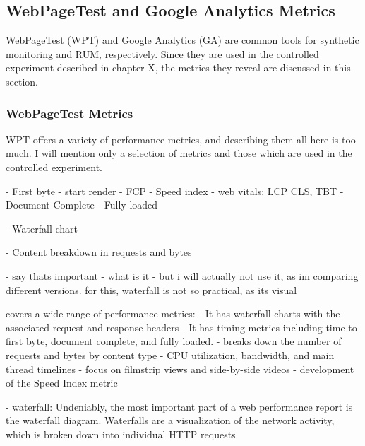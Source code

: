 
\subsection{WebPageTest and Google Analytics Metrics}
\label{subsection:wpt_ga_metrics}

WebPageTest (WPT) and Google Analytics (GA) are common tools for synthetic monitoring and RUM, respectively.
Since they are used in the controlled experiment described in chapter X, the metrics they reveal are discussed in this section.



\subsubsection{WebPageTest Metrics}

WPT offers a variety of performance metrics, and describing them all here is too much.
I will mention only a selection of metrics and those which are used in the controlled experiment.


- First byte
- start render
- FCP
- Speed index
- web vitals: LCP CLS, TBT
- Document Complete
- Fully loaded

- Waterfall chart

- Content breakdown in requests and bytes





- say thats important
- what is it
- but i will actually not use it, as im comparing different versions. for this, waterfall is not so practical, as its visual




covers a wide range of performance metrics:
- It has waterfall charts with the associated request and response headers
- It has timing metrics including time to first byte, document complete, and fully loaded.
- breaks down the number of requests and bytes by content type
- CPU utilization, bandwidth, and main thread timelines
- focus on filmstrip views and side-by-side videos
- development of the Speed Index metric

- waterfall: Undeniably, the most important part of a web performance report is the waterfall diagram. Waterfalls are a visualization of the network activity, which is broken down into individual HTTP requests



